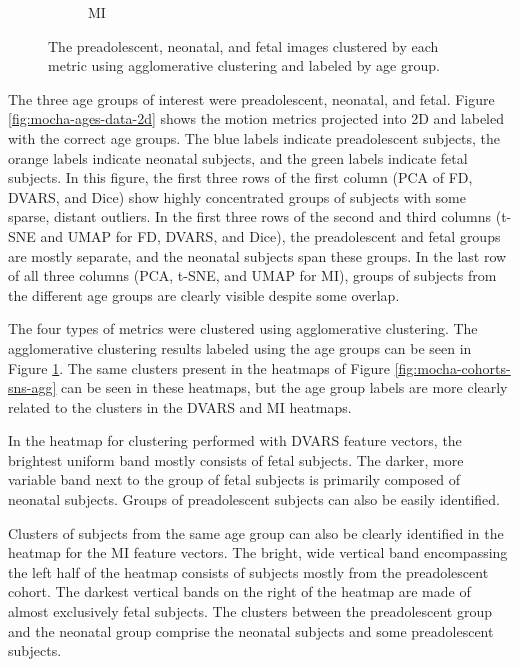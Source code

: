 \begin{figure}[t!]
\begin{subfigure}{0.45\textwidth}
		\caption{MI}
	\end{subfigure}
\vspace{-10mm}
\caption{The preadolescent, neonatal, and fetal images clustered by each metric using agglomerative clustering and labeled by age group.}
\label{fig:mocha-ages-sns-agg}
\end{figure}

The three age groups of interest were preadolescent, neonatal, and fetal. Figure \ref{fig:mocha-ages-data-2d} shows the motion metrics projected into 2D and labeled with the correct age groups. The blue labels indicate preadolescent subjects, the orange labels indicate neonatal subjects, and the green labels indicate fetal subjects. In this figure, the first three rows of the first column (PCA of FD, DVARS, and Dice) show highly concentrated groups of subjects with some sparse, distant outliers. In the first three rows of the second and third columns (t-SNE and UMAP for FD, DVARS, and Dice), the preadolescent and fetal groups are mostly separate, and the neonatal subjects span these groups. In the last row of all three columns (PCA, t-SNE, and UMAP for MI), groups of subjects from the different age groups are clearly visible despite some overlap. 

The four types of metrics were clustered using agglomerative clustering. The agglomerative clustering results labeled using the age groups can be seen in Figure \ref{fig:mocha-ages-sns-agg}. The same clusters present in the heatmaps of Figure \ref{fig:mocha-cohorts-sns-agg} can be seen in these heatmaps, but the age group labels are more clearly related to the clusters in the DVARS and MI heatmaps.

In the heatmap for clustering performed with DVARS feature vectors, the brightest uniform band mostly consists of fetal subjects. The darker, more variable band next to the group of fetal subjects is primarily composed of neonatal subjects. Groups of preadolescent subjects can also be easily identified. 

Clusters of subjects from the same age group can also be clearly identified in the heatmap for the MI feature vectors. The bright, wide vertical band encompassing the left half of the heatmap consists of subjects mostly from the preadolescent cohort. The darkest vertical bands on the right of the heatmap are made of almost exclusively fetal subjects. The clusters between the preadolescent group and the neonatal group comprise the neonatal subjects and some preadolescent subjects. 

